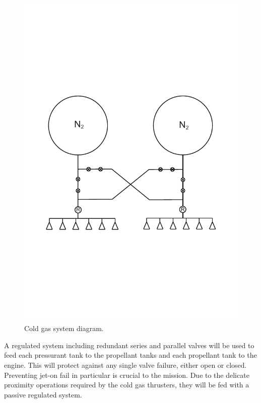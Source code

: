 \documentclass[paper=letter, fontsize=11pt]{scrartcl} %
\numberwithin{equation}{section} %
\numberwithin{figure}{section} %
\numberwithin{table}{section} %
\begin{document}
\begin{figure}[H]
	\begin{center}
	\includegraphics[height=.35\textheight]{cold_gas_system_diagram.pdf}
	\caption{Cold gas system diagram.}
	\end{center}
\end{figure}

A regulated system including redundant series and parallel valves will be used to feed each pressurant tank to the propellant tanks and each propellant tank to the engine. This will protect against any single valve failure, either open or closed. Preventing jet-on fail in particular is crucial to the mission. Due to the delicate proximity operations required by the cold gas thrusters, they will be fed with a passive regulated system.
\end{document}
